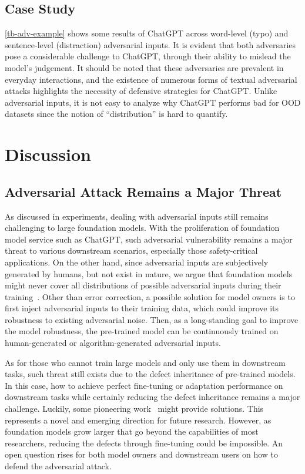 \documentclass[11pt]{article}
\newcommand{\chat}{ChatGPT\xspace}
\begin{document}
\subsection{Case Study}

\cref{tb-adv-example} shows some results of \chat across word-level (typo) and sentence-level (distraction) adversarial inputs.
It is evident that both adversaries pose a considerable challenge to \chat, through their ability to mislead the model's judgement. It should be noted that these adversaries are prevalent in everyday interactions, and the existence of numerous forms of textual adversarial attacks highlights the necessity of defensive strategies for \chat.
Unlike adversarial inputs, it is not easy to analyze why \chat performs bad for OOD datasets since the notion of ``distribution'' is hard to quantify.





\section{Discussion}




\subsection{Adversarial Attack Remains a Major Threat}
\label{sec-discuss-adv}

As discussed in experiments, dealing with adversarial inputs still remains challenging to large foundation models.
With the proliferation of foundation model service such as \chat, such adversarial vulnerability remains a major threat to various downstream scenarios, especially those safety-critical applications.
On the other hand, since adversarial inputs are subjectively generated by humans, but not exist in nature, we argue that foundation models might never cover all distributions of possible adversarial inputs during their training~\cite{ilyas2019adversarial}.
Other than error correction, a possible solution for model owners is to first inject adversarial inputs to their training data, which could improve its robustness to existing adversarial noise.
Then, as a long-standing goal to improve the model robustness, the pre-trained model can be continuously trained on human-generated or algorithm-generated adversarial inputs.

As for those who cannot train large models and only use them in downstream tasks, such threat still exists due to the defect inheritance of pre-trained models.
In this case, how to achieve perfect fine-tuning or adaptation performance on downstream tasks while certainly reducing the defect inheritance remains a major challenge.
Luckily, some pioneering work~\cite{zhang2022remos, chin2021renofeation} might provide solutions.
This represents a novel and emerging direction for future research.
However, as foundation models grow larger that go beyond the capabilities of most researchers, reducing the defects through fine-tuning could be impossible.
An open question rises for both model owners and downstream users on how to defend the adversarial attack.
\end{document}
